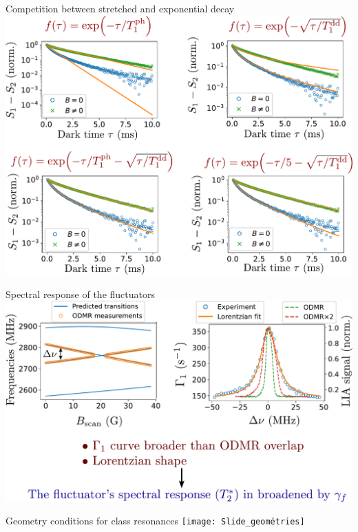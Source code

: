 \documentclass{beamer}
\begin{document}
\begin{frame}{Competition between stretched and exponential decay}
\centering
\includegraphics[width=\textwidth,height=0.9\textheight,keepaspectratio]{Slide_T1_exp_et_stretch}
\end{frame}

\begin{frame}{Spectral response of the fluctuators}
\centering
\includegraphics[width=\textwidth,height=0.9\textheight,keepaspectratio]{Slide_fluct_linewidth}
\end{frame}

\begin{frame}{Geometry conditions for class resonances}
\centering
\texttt{[image: Slide\_geométries]}
\end{frame}
\end{document}
